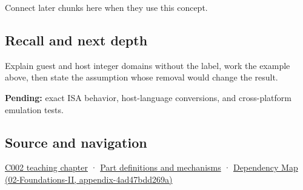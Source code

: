 Connect later chunks here when they use this concept.

\subsection{Recall and next depth}\label{appendix-33e7a011b684-recall-and-next-depth}

Explain guest and host integer domains without the label, work the example above, then state the assumption whose removal would change the result.

\textbf{Pending:} exact ISA behavior, host-language conversions, and cross-platform emulation tests.

\subsection{Source and navigation}\label{appendix-33e7a011b684-source-and-navigation}

\hyperref[01-foundations-i-ch001-arithmetic-becomes-a-policy]{C002 teaching chapter} · \hyperref[appendix-fd090d982a15]{Part definitions and mechanisms} · \href{../02-Foundations-II/main.pdf\#nameddest=appendix-4ad47bdd269a}{Dependency Map (02-Foundations-II, appendix-4ad47bdd269a)}
